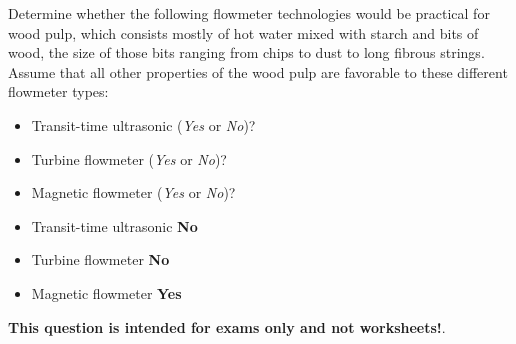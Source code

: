 

Determine whether the following flowmeter technologies would be practical for wood pulp, which consists mostly of hot water mixed with starch and bits of wood, the size of those bits ranging from chips to dust to long fibrous strings.  Assume that all other properties of the wood pulp are favorable to these different flowmeter types:

\begin{itemize}
\item{} Transit-time ultrasonic ({\it Yes} or {\it No})?
\vskip 10pt
\item{} Turbine flowmeter ({\it Yes} or {\it No})?
\vskip 10pt
\item{} Magnetic flowmeter ({\it Yes} or {\it No})?
\end{itemize}







\begin{itemize}
\item{} Transit-time ultrasonic {\bf No}
\item{} Turbine flowmeter {\bf No}
\item{} Magnetic flowmeter {\bf Yes} 
\end{itemize}







{\bf This question is intended for exams only and not worksheets!}.



